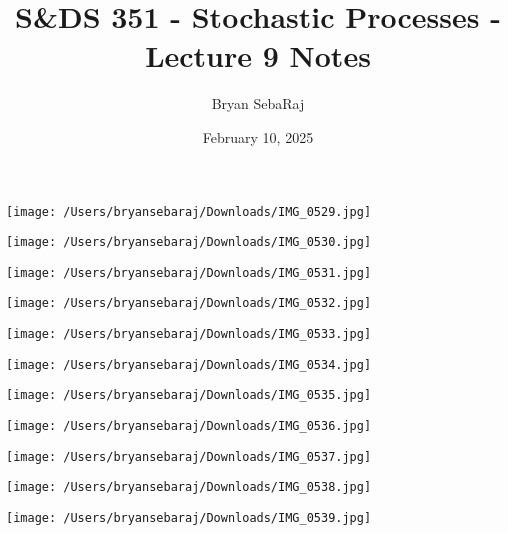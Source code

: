 \documentclass{article}
\title{S\&DS 351 - Stochastic Processes - Lecture 9 Notes}
\author{Bryan SebaRaj}
\date{February 10, 2025}
\begin{document}
\maketitle


\texttt{[image: /Users/bryansebaraj/Downloads/IMG\_0529.jpg]}

\texttt{[image: /Users/bryansebaraj/Downloads/IMG\_0530.jpg]}

\texttt{[image: /Users/bryansebaraj/Downloads/IMG\_0531.jpg]}

\texttt{[image: /Users/bryansebaraj/Downloads/IMG\_0532.jpg]}


\texttt{[image: /Users/bryansebaraj/Downloads/IMG\_0533.jpg]}


\texttt{[image: /Users/bryansebaraj/Downloads/IMG\_0534.jpg]}


\texttt{[image: /Users/bryansebaraj/Downloads/IMG\_0535.jpg]}

\texttt{[image: /Users/bryansebaraj/Downloads/IMG\_0536.jpg]}

\texttt{[image: /Users/bryansebaraj/Downloads/IMG\_0537.jpg]}

\texttt{[image: /Users/bryansebaraj/Downloads/IMG\_0538.jpg]}

\texttt{[image: /Users/bryansebaraj/Downloads/IMG\_0539.jpg]}
\end{document}
